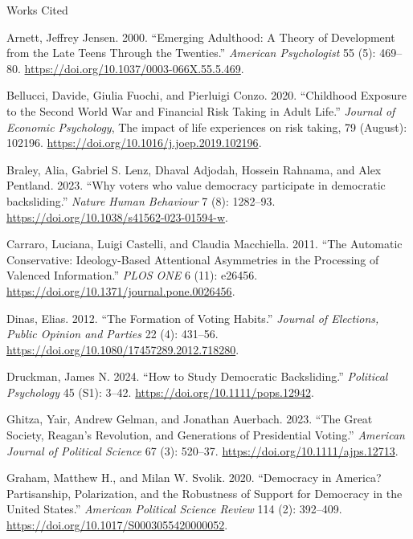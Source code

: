 \documentclass[
  ignorenonframetext,
]{beamer}
\newlength{\cslhangindent}
\newenvironment{CSLReferences}[2] %
 {\begin{list}{}{%
  \setlength{\itemindent}{0pt}
  \setlength{\leftmargin}{0pt}
  \setlength{\parsep}{0pt}
  \ifodd #1
   \setlength{\leftmargin}{\cslhangindent}
   \setlength{\itemindent}{-1\cslhangindent}
  \fi
  \setlength{\itemsep}{#2\baselineskip}}}
 {\end{list}}
\begin{document}
\begin{frame}[allowframebreaks]{Works Cited}
\label{works-cited}
\label{refs}
\begin{CSLReferences}{1}{0}
Arnett, Jeffrey Jensen. 2000. {``Emerging Adulthood: A Theory of
Development from the Late Teens Through the Twenties.''} \emph{American
Psychologist} 55 (5): 469--80.
\url{https://doi.org/10.1037/0003-066X.55.5.469}.

Bellucci, Davide, Giulia Fuochi, and Pierluigi Conzo. 2020. {``Childhood
Exposure to the Second World War and Financial Risk Taking in Adult
Life.''} \emph{Journal of Economic Psychology}, The impact of life
experiences on risk taking, 79 (August): 102196.
\url{https://doi.org/10.1016/j.joep.2019.102196}.

Braley, Alia, Gabriel S. Lenz, Dhaval Adjodah, Hossein Rahnama, and Alex
Pentland. 2023. {``Why voters who value democracy participate in
democratic backsliding.''} \emph{Nature Human Behaviour} 7 (8):
1282--93. \url{https://doi.org/10.1038/s41562-023-01594-w}.

Carraro, Luciana, Luigi Castelli, and Claudia Macchiella. 2011. {``The
Automatic Conservative: Ideology-Based Attentional Asymmetries in the
Processing of Valenced Information.''} \emph{PLOS ONE} 6 (11): e26456.
\url{https://doi.org/10.1371/journal.pone.0026456}.

Dinas, Elias. 2012. {``The Formation of Voting Habits.''} \emph{Journal
of Elections, Public Opinion and Parties} 22 (4): 431--56.
\url{https://doi.org/10.1080/17457289.2012.718280}.

Druckman, James N. 2024. {``How to Study Democratic Backsliding.''}
\emph{Political Psychology} 45 (S1): 3--42.
\url{https://doi.org/10.1111/pops.12942}.

Ghitza, Yair, Andrew Gelman, and Jonathan Auerbach. 2023. {``The Great
Society, Reagan's Revolution, and Generations of Presidential Voting.''}
\emph{American Journal of Political Science} 67 (3): 520--37.
\url{https://doi.org/10.1111/ajps.12713}.

Graham, Matthew H., and Milan W. Svolik. 2020. {``Democracy in America?
Partisanship, Polarization, and the Robustness of Support for Democracy
in the United States.''} \emph{American Political Science Review} 114
(2): 392--409. \url{https://doi.org/10.1017/S0003055420000052}.


\end{CSLReferences}
\end{frame}
\end{document}
